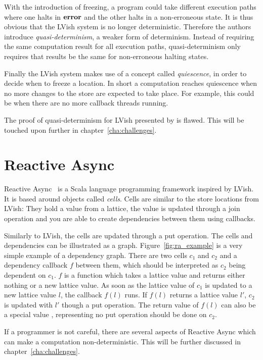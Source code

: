 With the introduction of freezing, a program could take different execution
paths where one halts in $\mbox{{\bf error}}$ and the other halts in a non-erroneous state.
It is thus obvious that the LVish system is no longer deterministic. Therefore
the authors introduce \emph{quasi-determinism}, a weaker form of
determinism. Instead of requiring the same computation result for all execution
paths, quasi-determinism only requires that results be the same for
non-erroneous halting states.

Finally the LVish system makes use of a concept called \emph{quiescence}, in
order to decide when to freeze a location. In short a computation reaches
quiescence when no more changes to the store are expected to take place. For
example, this could be when there are no more callback threads running.

The proof of quasi-determinism for LVish presented by
\textcite{kuper2014freezeTR} is flawed. This will be touched upon further in
chapter~\ref{cha:challenges}.


\section{Reactive Async}\label{sec:reactive_async}

Reactive Async~\parencite{conf/scala/HallerGES16} is a Scala language
programming framework inspired by LVish. It is based around objects called
\emph{cells}.  Cells are similar to the store locations from LVish: They hold a
value from a lattice, the value is updated through a join operation and you are
able to create dependencies between them using callbacks.

Similarly to LVish, the cells are updated through a put operation.  The cells and
dependencies can be illustrated as a graph.  Figure~\ref{fig:ra_example} is a
very simple example of a dependency graph.  There are two cells $c_1$ and $c_2$
and a dependency callback $f$ between them, which should be interpreted as $c_2$
being dependent on $c_1$.  $f$ is a function which takes a lattice value and
returns either nothing or a new lattice value.  As soon as the lattice value of
$c_1$ is updated to a new lattice value $l$, the callback $f(l)$ runs. If $f(l)$
returns a lattice value $l'$, $c_2$ is updated with $l'$ though a put operation.
The return value of $f(l)$ can also be a special value ,
representing no put operation should be done on $c_2$.

If a programmer is not careful, there are several aspects of Reactive Async
which can make a computation non-deterministic. This will be further discussed
in chapter~\ref{cha:challenges}. 

